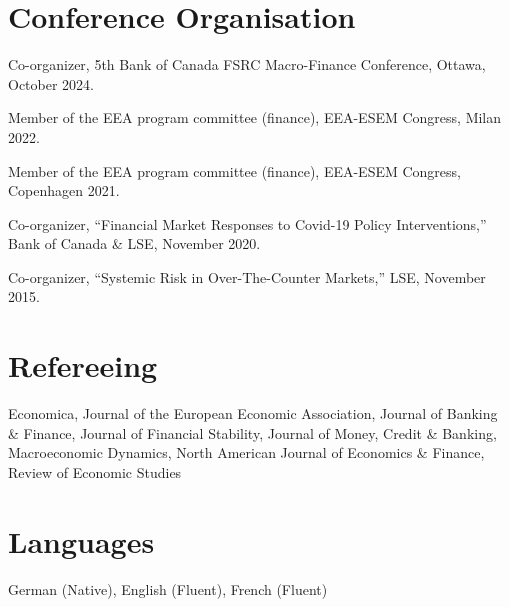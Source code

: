 \documentclass[margin,line, 11pt]{res}
\newenvironment{list1}{
  \begin{list}{\ding{113}}{%
      \setlength{\itemsep}{0in}
      \setlength{\parsep}{0in} \setlength{\parskip}{0in}
      \setlength{\topsep}{0in} \setlength{\partopsep}{0in} 
      \setlength{\leftmargin}{0.17in}}}{\end{list}}
\begin{document}
\begin{resume}
\section{\sc Conference Organisation} 
\begin{list1}
\item[] Co-organizer, 5th Bank of Canada FSRC Macro-Finance Conference, Ottawa, October 2024.
\item[] Member of the EEA program committee (finance), EEA-ESEM Congress, Milan 2022.
\item[] Member of the EEA program committee (finance), EEA-ESEM Congress, Copenhagen 2021.
\item[] Co-organizer, ``Financial Market Responses to Covid-19 Policy Interventions,'' Bank of Canada \& LSE, November 2020.
\item[] Co-organizer, ``Systemic Risk in Over-The-Counter Markets,'' LSE, November 2015.
\end{list1}

\section{\sc Refereeing}
\begin{list1}
\item[] Economica, Journal of the European Economic Association, Journal of Banking \& Finance, Journal of Financial Stability, Journal of Money, Credit \& Banking, Macroeconomic Dynamics, North American Journal of Economics \& Finance, Review of Economic Studies
\end{list1}

\section{\sc Languages}
\begin{list1}
\item[] German (Native), English (Fluent), French (Fluent)
\end{list1}




\end{resume}
\end{document}
